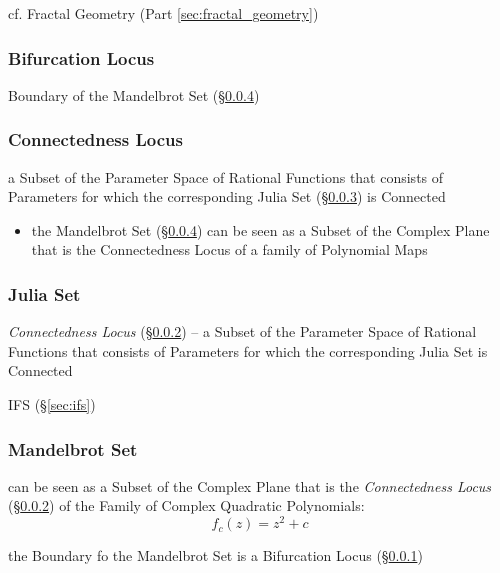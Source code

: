 cf. Fractal Geometry (Part \ref{sec:fractal_geometry})



\subsubsection{Bifurcation Locus}\label{sec:bifurcation_locus}

Boundary of the Mandelbrot Set (\S\ref{sec:mandelbrot_set})



\subsubsection{Connectedness Locus}\label{sec:connectedness_locus}

a Subset of the Parameter Space of Rational Functions that consists of
Parameters for which the corresponding Julia Set (\S\ref{sec:julia_set}) is
Connected

\begin{itemize}
  \item the Mandelbrot Set (\S\ref{sec:mandelbrot_set}) can be seen as a Subset
    of the Complex Plane that is the Connectedness Locus of a family of
    Polynomial Maps
\end{itemize}



\subsubsection{Julia Set}\label{sec:julia_set}

\emph{Connectedness Locus} (\S\ref{sec:connectedness_locus}) -- a Subset of the
Parameter Space of Rational Functions that consists of Parameters for which the
corresponding Julia Set is Connected

IFS (\S\ref{sec:ifs})



\subsubsection{Mandelbrot Set}\label{sec:mandelbrot_set}

can be seen as a Subset of the Complex Plane that is the \emph{Connectedness
  Locus} (\S\ref{sec:connectedness_locus}) of the Family of Complex Quadratic
Polynomials:
\[
  f_c(z) = z^2 + c
\]

the Boundary fo the Mandelbrot Set is a Bifurcation Locus
(\S\ref{sec:bifurcation_locus})



